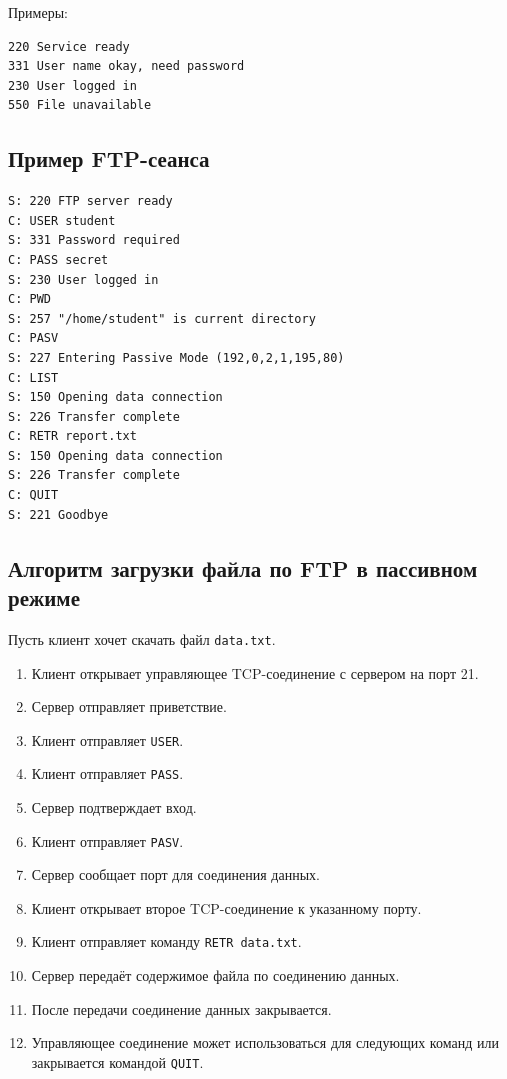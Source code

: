 \documentclass[12pt,a4paper]{article}
\begin{document}
Примеры:
\begin{lstlisting}
220 Service ready
331 User name okay, need password
230 User logged in
550 File unavailable
\end{lstlisting}

\subsection{Пример FTP-сеанса}

\begin{lstlisting}
S: 220 FTP server ready
C: USER student
S: 331 Password required
C: PASS secret
S: 230 User logged in
C: PWD
S: 257 "/home/student" is current directory
C: PASV
S: 227 Entering Passive Mode (192,0,2,1,195,80)
C: LIST
S: 150 Opening data connection
S: 226 Transfer complete
C: RETR report.txt
S: 150 Opening data connection
S: 226 Transfer complete
C: QUIT
S: 221 Goodbye
\end{lstlisting}

\subsection{Алгоритм загрузки файла по FTP в пассивном режиме}

Пусть клиент хочет скачать файл \texttt{data.txt}.

\begin{enumerate}
    \item Клиент открывает управляющее TCP-соединение с сервером на порт 21.
    \item Сервер отправляет приветствие.
    \item Клиент отправляет \texttt{USER}.
    \item Клиент отправляет \texttt{PASS}.
    \item Сервер подтверждает вход.
    \item Клиент отправляет \texttt{PASV}.
    \item Сервер сообщает порт для соединения данных.
    \item Клиент открывает второе TCP-соединение к указанному порту.
    \item Клиент отправляет команду \texttt{RETR data.txt}.
    \item Сервер передаёт содержимое файла по соединению данных.
    \item После передачи соединение данных закрывается.
    \item Управляющее соединение может использоваться для следующих команд или закрывается командой \texttt{QUIT}.
\end{enumerate}
\end{document}
